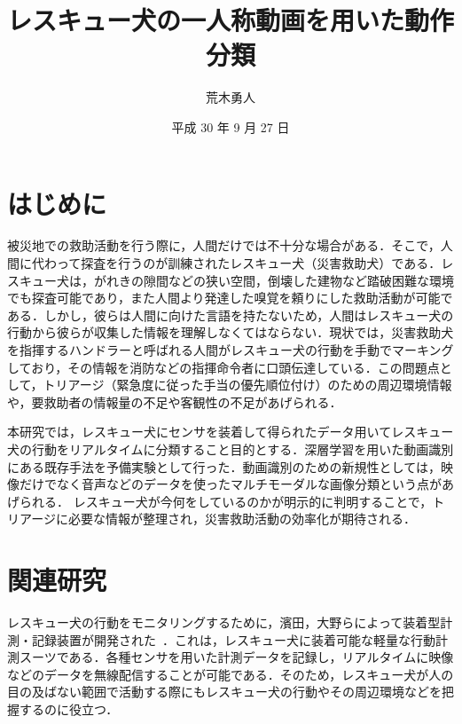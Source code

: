 \documentclass[twocolumn, a4paper]{UECIEresume}
\title{レスキュー犬の一人称動画を用いた動作分類}
\date{平成 30 年 9 月 27 日}
\affiliation{総合情報学科 メディア情報学コース}
\author{荒木勇人}
\begin{document}
\maketitle

\section{はじめに}
被災地での救助活動を行う際に，人間だけでは不十分な場合がある．そこで，人間に代わって探査を行うのが訓練されたレスキュー犬（災害救助犬）である．レスキュー犬は，がれきの隙間などの狭い空間，倒壊した建物など踏破困難な環境でも探査可能であり，また人間より発達した嗅覚を頼りにした救助活動が可能である．しかし，彼らは人間に向けた言語を持たないため，人間はレスキュー犬の行動から彼らが収集した情報を理解しなくてはならない．現状では，災害救助犬を指揮するハンドラーと呼ばれる人間がレスキュー犬の行動を手動でマーキングしており，その情報を消防などの指揮命令者に口頭伝達している．この問題点として，トリアージ（緊急度に従った手当の優先順位付け）のための周辺環境情報や，要救助者の情報量の不足や客観性の不足があげられる．

本研究では，レスキュー犬にセンサを装着して得られたデータ用いてレスキュー犬の行動をリアルタイムに分類すること目的とする．深層学習を用いた動画識別にある既存手法を予備実験として行った．動画識別のための新規性としては，映像だけでなく音声などのデータを使ったマルチモーダルな画像分類という点があげられる．
レスキュー犬が今何をしているのかが明示的に判明することで，トリアージに必要な情報が整理され，災害救助活動の効率化が期待される．

\section{関連研究}

レスキュー犬の行動をモニタリングするために，濱田，大野らによって装着型計測・記録装置が開発された~\cite{dog01}．これは，レスキュー犬に装着可能な軽量な行動計測スーツである．各種センサを用いた計測データを記録し，リアルタイムに映像などのデータを無線配信することが可能である．そのため，レスキュー犬が人の目の及ばない範囲で活動する際にもレスキュー犬の行動やその周辺環境などを把握するのに役立つ．
\end{document}
